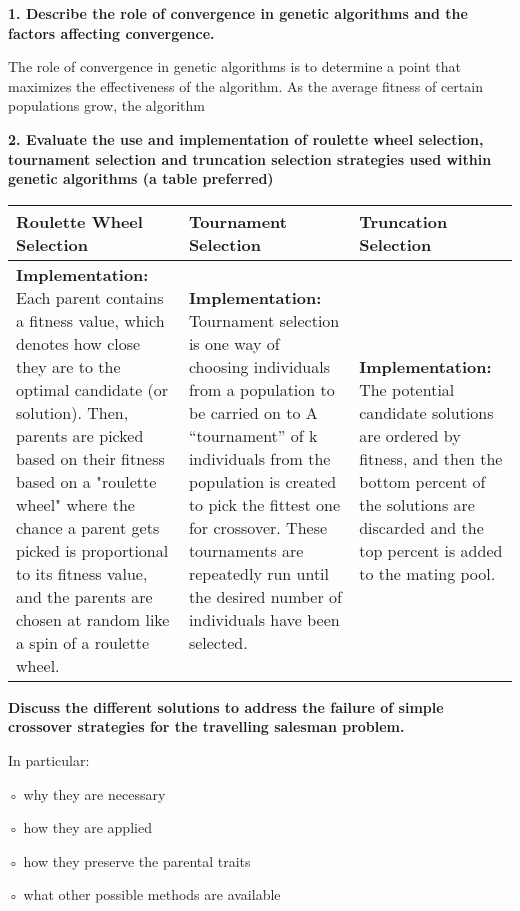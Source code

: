 \documentclass[12pt]{article}
\newenvironment{boldenv}
  {\bfseries}%
  {\medskip}%
\begin{document}
\textbf{1. Describe the role of convergence in genetic algorithms and the factors affecting convergence.}

\medskip

The role of convergence in genetic algorithms is to determine a point that maximizes the effectiveness of the algorithm. As the average fitness of certain populations grow, the algorithm

\bigskip

\textbf{2. Evaluate the use and implementation of roulette wheel selection, tournament selection and truncation selection strategies used within genetic algorithms (a table preferred)}

\begin{table}[H]
	\def\arraystretch{1.5}
	\begin{tabularx}{\linewidth}{|
			>{\RaggedRight}X|
			>{\RaggedRight}X|
			>{\RaggedRight}X|
		}
		\hline
		\textbf{Roulette Wheel Selection}
		 &
		\textbf{Tournament Selection}
		 &
		\textbf{Truncation Selection}
		\\\hline

		\textbf{Implementation:} Each parent contains a fitness value, which denotes how close they are to the
		optimal candidate (or solution). Then, parents are picked based on their
		fitness based on a "roulette wheel" where the chance a parent gets picked is proportional to its fitness value, and the parents are chosen at random like a spin of a roulette wheel.

		 &

		\textbf{Implementation:} Tournament selection is one way of choosing individuals from a population to be carried on to
		A ``tournament''
		of k individuals from the population is created to pick the fittest one for crossover. These tournaments
		are repeatedly run until the desired number of individuals have been selected.

		 &

		\textbf{Implementation:} The potential candidate solutions are ordered by fitness, and then the bottom percent of the solutions are discarded and the top percent is added to the mating pool.

		\\\hline
	\end{tabularx}
\end{table}

\begin{boldenv}
	Discuss the different solutions to address the failure of simple crossover strategies for the travelling salesman problem.

	In particular:

	◦ why they are necessary

	◦ how they are applied

	◦ how they preserve the parental traits

	◦ what other possible methods are available
\end{boldenv}
\end{document}
